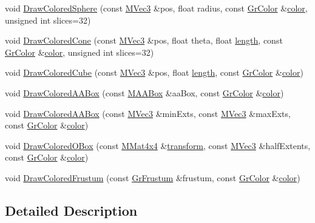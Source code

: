 \begin{CompactItemize}
\item 
void \hyperlink{class_gr_render_util_d10d280236c7ab0ffa19c61a47a1afce}{DrawColoredSphere} (const \hyperlink{class_m_vec3}{MVec3} \&pos, float radius, const \hyperlink{class_gr_color}{GrColor} \&\hyperlink{glext_8h_3ea846f998d64f079b86052b6c4193a8}{color}, unsigned int slices=32)
\item 
void \hyperlink{class_gr_render_util_f53586276257c886ea2d3c526db1d233}{DrawColoredCone} (const \hyperlink{class_m_vec3}{MVec3} \&pos, float theta, float \hyperlink{wglext_8h_74efbdef71b2e5711088ae39fc925d2d}{length}, const \hyperlink{class_gr_color}{GrColor} \&\hyperlink{glext_8h_3ea846f998d64f079b86052b6c4193a8}{color}, unsigned int slices=32)
\item 
void \hyperlink{class_gr_render_util_754e864fcf78c7f20fa4a417475960cc}{DrawColoredCube} (const \hyperlink{class_m_vec3}{MVec3} \&pos, float \hyperlink{wglext_8h_74efbdef71b2e5711088ae39fc925d2d}{length}, const \hyperlink{class_gr_color}{GrColor} \&\hyperlink{glext_8h_3ea846f998d64f079b86052b6c4193a8}{color})
\item 
void \hyperlink{class_gr_render_util_8c4e206af04748afd131741ef7be632c}{DrawColoredAABox} (const \hyperlink{class_m_a_a_box}{MAABox} \&aaBox, const \hyperlink{class_gr_color}{GrColor} \&\hyperlink{glext_8h_3ea846f998d64f079b86052b6c4193a8}{color})
\item 
void \hyperlink{class_gr_render_util_2393c582878b53d17b85ab809f44f15c}{DrawColoredAABox} (const \hyperlink{class_m_vec3}{MVec3} \&minExts, const \hyperlink{class_m_vec3}{MVec3} \&maxExts, const \hyperlink{class_gr_color}{GrColor} \&\hyperlink{glext_8h_3ea846f998d64f079b86052b6c4193a8}{color})
\item 
void \hyperlink{class_gr_render_util_5cd3a6ac45a9d948b093495641d907dd}{DrawColoredOBox} (const \hyperlink{class_m_mat4x4}{MMat4x4} \&\hyperlink{glext__bak_8h_07993c0d92c1aeeb357ba0495c8b5325}{transform}, const \hyperlink{class_m_vec3}{MVec3} \&halfExtents, const \hyperlink{class_gr_color}{GrColor} \&\hyperlink{glext_8h_3ea846f998d64f079b86052b6c4193a8}{color})
\item 
void \hyperlink{class_gr_render_util_ed7cf8334d73eb87da59905af527b2bb}{DrawColoredFrustum} (const \hyperlink{class_gr_frustum}{GrFrustum} \&frustum, const \hyperlink{class_gr_color}{GrColor} \&\hyperlink{glext_8h_3ea846f998d64f079b86052b6c4193a8}{color})
\end{CompactItemize}


\subsection{Detailed Description}


